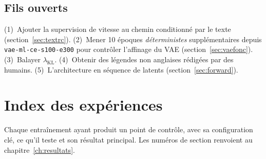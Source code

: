 \documentclass[12pt,a4paper,oneside]{report}
\theoremstyle{definition}
\theoremstyle{plain}
\newcommand{\lkl}{\ensuremath{\lambda_{\mathrm{KL}}}}
\begin{document}
\section{Fils ouverts}
(1)~Ajouter la supervision de vitesse au chemin conditionné par le texte
(section~\ref{sec:textrc}). (2)~Mener 10 époques \emph{déterministes}
supplémentaires depuis \texttt{vae-ml-ce-s100-e300} pour contrôler l'affinage du
VAE (section~\ref{sec:vaefonc}). (3)~Balayer \lkl{}. (4)~Obtenir des légendes non
anglaises rédigées par des humains. (5)~L'architecture en séquence de latents
(section~\ref{sec:forward}).

\chapter{Index des expériences}
\label{app:index}

Chaque entraînement ayant produit un point de contrôle, avec sa configuration
clé, ce qu'il teste et son résultat principal. Les numéros de section renvoient au
chapitre~\ref{ch:resultats}.
\end{document}
